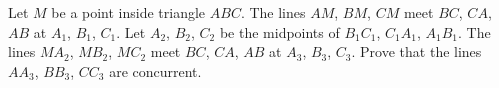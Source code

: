 Let $M$ be a point inside triangle $ABC$. The lines $AM$, $BM$, $CM$ meet $BC$, $CA$, $AB$ at $A_1$, $B_1$, $C_1$. Let $A_2$, $B_2$, $C_2$ be the midpoints of $B_1C_1$, $C_1A_1$, $A_1B_1$. The lines $MA_2$, $MB_2$, $MC_2$ meet $BC$, $CA$, $AB$ at $A_3$, $B_3$, $C_3$. Prove that the lines $AA_3$, $BB_3$, $CC_3$ are concurrent.
